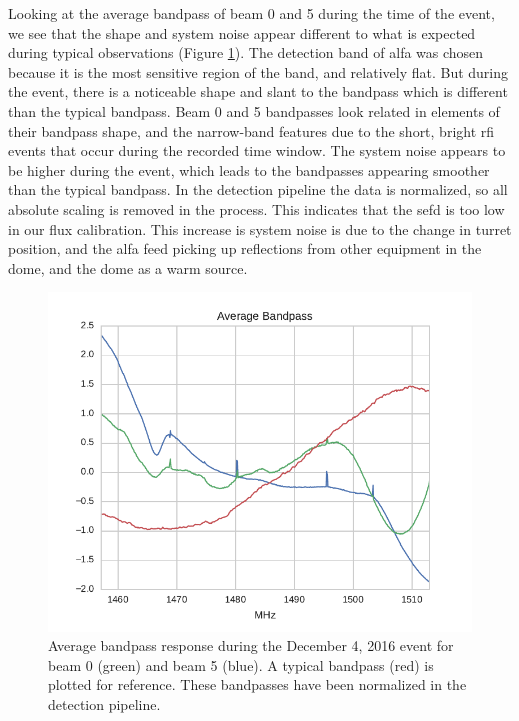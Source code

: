 \documentclass[a4paper,fleqn,usenatbib]{mnras}
\begin{document}
Looking at the average bandpass of beam 0 and 5 during the time of the event, we
see that the shape and system noise appear different to what is expected during
typical observations (Figure \ref{fig:bandpass_response}).  The detection band
of \gls{alfa} was chosen because it is the most sensitive region of the band,
and relatively flat. But during the event, there is a noticeable shape and slant
to the bandpass which is different than the typical bandpass.  Beam 0 and 5
bandpasses look related in elements of their bandpass shape, and the narrow-band
features due to the short, bright \gls{rfi} events that occur during the
recorded time window. The system noise appears to be higher during the event,
which leads to the bandpasses appearing smoother than the typical bandpass.  In
the detection pipeline the data is normalized, so all absolute scaling is
removed in the process. This indicates that the \gls{sefd} is too low in our
flux calibration. This increase is system noise is due to the change in turret
position, and the \gls{alfa} feed picking up reflections from other equipment in
the dome, and the dome as a warm source.

\begin{figure}
    \includegraphics[width=1.0\linewidth]{figures/bandpass_response.pdf}
    \caption{Average bandpass response during the December 4, 2016 event for beam
    0 (green) and beam 5 (blue). A typical bandpass (red) is plotted for
    reference. These bandpasses have been normalized in the detection pipeline.
    }
    \label{fig:bandpass_response}
\end{figure}
\end{document}
